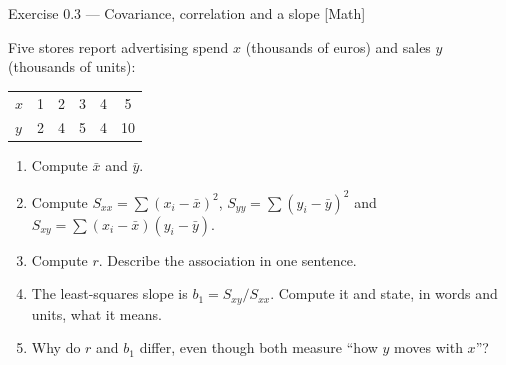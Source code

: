 \documentclass[aspectratio=169,11pt]{beamer}
\begin{document}
\begin{frame}{Exercise 0.3 --- Covariance, correlation and a slope [Math]}
  \begin{exercise}
    Five stores report advertising spend $x$ (thousands of euros) and sales
    $y$ (thousands of units):
    \begin{center}\footnotesize
    \begin{tabular}{@{}lccccc@{}}
      \toprule
      $x$ & 1 & 2 & 3 & 4 & 5 \\
      $y$ & 2 & 4 & 5 & 4 & 10 \\
      \bottomrule
    \end{tabular}
    \end{center}
    \begin{enumerate}
      \item Compute $\bar x$ and $\bar y$.
      \item Compute $S_{xx} = \sum (x_i-\bar x)^2$,
            $S_{yy} = \sum (y_i-\bar y)^2$ and
            $S_{xy} = \sum (x_i-\bar x)(y_i-\bar y)$.
      \item Compute $r$. Describe the association in one sentence.
      \item The least-squares slope is $b_1 = S_{xy}/S_{xx}$. Compute it and
            state, in words and units, what it means.
      \item Why do $r$ and $b_1$ differ, even though both measure ``how $y$
            moves with $x$''?
    \end{enumerate}
  \end{exercise}
\end{frame}
\end{document}
